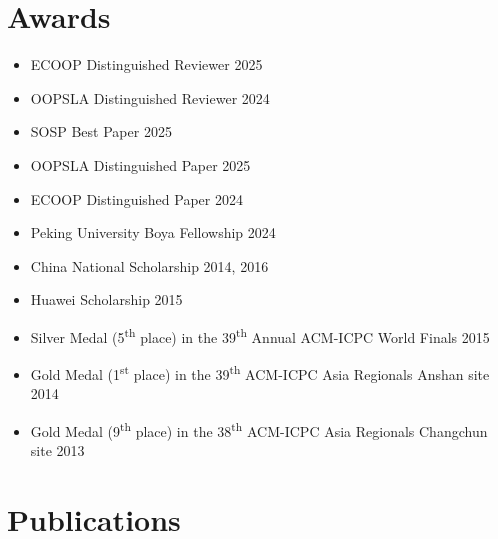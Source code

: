 \documentclass[11pt,letterpaper,sans]{moderncv}
\begin{document}
\section{Awards}

\begin{itemize}
\item ECOOP Distinguished Reviewer \hfill 2025
\item OOPSLA Distinguished Reviewer \hfill 2024

\vspace{4pt}

\item SOSP Best Paper \hfill 2025
\item OOPSLA Distinguished Paper \hfill 2025
\item ECOOP Distinguished Paper \hfill 2024

\vspace{4pt}

\item Peking University Boya Fellowship \hfill 2024
\item China National Scholarship \hfill 2014, 2016
\item Huawei Scholarship \hfill 2015

  \vspace{4pt}

  \item Silver Medal (5\textsuperscript{th} place) in the 39\textsuperscript{th} Annual ACM-ICPC World Finals \hfill 2015
  \item Gold Medal (1\textsuperscript{st} place) in the 39\textsuperscript{th} ACM-ICPC Asia Regionals Anshan site \hfill 2014
  \item Gold Medal (9\textsuperscript{th} place) in the 38\textsuperscript{th} ACM-ICPC Asia Regionals Changchun site \hfill 2013
\end{itemize}

\section{Publications}
\vspace{4pt}
\vspace{4pt}
\vspace{4pt}
\end{document}

